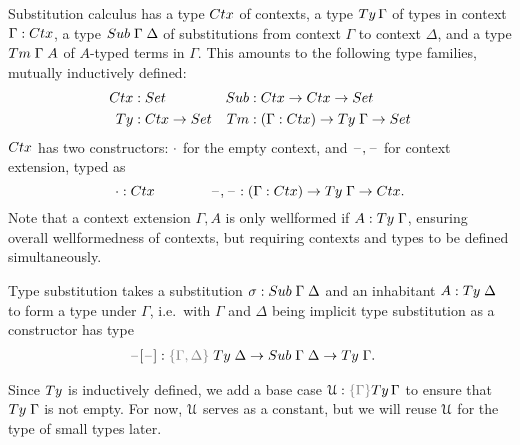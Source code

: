 \documentclass[a4paper,UKenglish,numberwithinsect,cleveref,thm-restate]{lipics-v2021}
\begin{document}
Substitution calculus has a type $\Ctx$ of contexts, a type $\Ty\,\Gamma$ of types in context $\Gamma : \Ctx$, a type $\Sub\;\Gamma\;\Delta$ of substitutions from context $\Gamma$ to context $\Delta$, and a type $\Tm\;\Gamma\;A$ of $A$-typed terms in $\Gamma$. 
This amounts to the following type families, mutually inductively defined:
\begin{align*}
  \Ctx   & : \Set                   & \Sub   & : \Ctx \to \Ctx \to \Set \\
  \Ty    & : \Ctx \to \Set          & \Tm    & : (\Gamma : \Ctx) \to \Ty\;\Gamma \to \Set
\end{align*}
$\Ctx$ has two constructors: $\cdot$ for the empty context, and $\mathord{\hspace{1pt}\text{--}\hspace{1pt}},\mathord{\hspace{1pt}\text{--}\hspace{1pt}}$ for context extension, typed as
\[
  \emptyctx : \Ctx
  \qquad\qquad
  \blank,\blank : (\Gamma : \Ctx) \to \Ty\;\Gamma \to \Ctx.
\]
Note that a context extension $\Gamma , A$ is only wellformed if $A : \Ty\;\Gamma$, ensuring overall wellformedness of contexts, but requiring contexts and types to be defined simultaneously.

Type substitution takes a substitution $\sigma : \Sub\;\Gamma\;\Delta$ and an inhabitant $A : \Ty\;\Delta$ to form a type under $\Gamma$, i.e.\ with $\Gamma$ and $\Delta$ being implicit type substitution as a constructor has type
\begin{alignat*}{3}
  \sub{\blank}{\blank} &: \implicit{\Gamma, \Delta} \; \Ty\;\Delta \to \Sub\;\Gamma\;\Delta \to \Ty\;\Gamma .
\end{alignat*}

Since $\Ty$ is inductively defined, we add a base case $\UU : \implicit{\Gamma} \Ty\,\Gamma$ to ensure that $\Ty\;\Gamma$ is not empty.
%
For now, $\mathcal{U}$ serves as a constant, but we will reuse $\mathcal{U}$ for the type of small types later.
\end{document}
